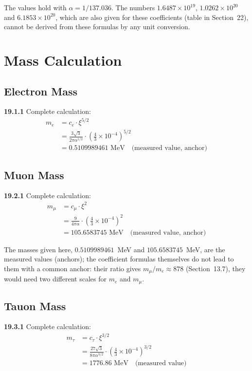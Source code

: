 The values hold with $\alpha = 1/137.036$. The numbers $1.6487\times10^{19}$, $1.0262\times10^{20}$ and $6.1853\times10^{20}$, which are also given for these coefficients (table in Section~22), cannot be derived from these formulas by any unit conversion.

\section{Mass Calculation}

\subsection{Electron Mass}
\noindent \textbf{19.1.1} Complete calculation:
\begin{align}
	m_e &= c_e \cdot \xi^{5/2} \\
	&= \frac{3\sqrt{3}}{2\pi\alpha^{1/2}} \cdot \left(\frac{4}{3} \times 10^{-4}\right)^{5/2} \\
	&= 0.5109989461 \text{ MeV} \quad \text{(measured value, anchor)}
\end{align}

\subsection{Muon Mass}
\noindent \textbf{19.2.1} Complete calculation:
\begin{align}
	m_\mu &= c_\mu \cdot \xi^2 \\
	&= \frac{9}{4\pi\alpha} \cdot \left(\frac{4}{3} \times 10^{-4}\right)^2 \\
	&= 105.6583745 \text{ MeV} \quad \text{(measured value, anchor)}
\end{align}

The masses given here, $0.5109989461$~MeV and $105.6583745$~MeV, are the measured values (anchors); the coefficient formulas themselves do not lead to them with a common anchor: their ratio gives $m_\mu/m_e \approx 878$ (Section~13.7), they would need two different scales for $m_e$ and $m_\mu$.

\subsection{Tauon Mass}
\noindent \textbf{19.3.1} Complete calculation:
\begin{align}
	m_\tau &= c_\tau \cdot \xi^{3/2} \\
	&= \frac{27\sqrt{3}}{8\pi\alpha^{3/2}} \cdot \left(\frac{4}{3} \times 10^{-4}\right)^{3/2} \\
	&= 1776.86 \text{ MeV} \quad \text{(measured value)}
\end{align}

